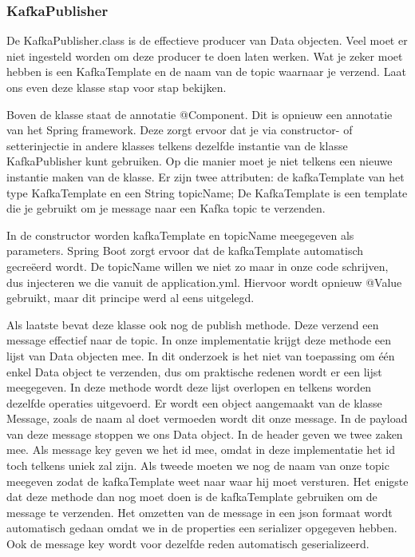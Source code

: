     \subsubsection{KafkaPublisher}
    De KafkaPublisher.class is de effectieve producer van Data objecten. Veel moet er niet ingesteld worden om deze producer te doen laten werken. Wat je zeker moet hebben is een KafkaTemplate en de naam van de topic waarnaar je verzend. Laat ons even deze klasse stap voor stap bekijken.
    
    Boven de klasse staat de annotatie @Component. Dit is opnieuw een annotatie van het Spring framework. Deze zorgt ervoor dat je via constructor- of setterinjectie in andere klasses telkens dezelfde instantie van de klasse KafkaPublisher kunt gebruiken. Op die manier moet je niet telkens een nieuwe instantie maken van de klasse. Er zijn twee attributen: de kafkaTemplate van het type KafkaTemplate en een String topicName; De KafkaTemplate is een template die je gebruikt om je message naar een Kafka topic te verzenden.
    
    In de constructor worden kafkaTemplate en topicName meegegeven als parameters. Spring Boot zorgt ervoor dat de kafkaTemplate automatisch gecreëerd wordt. De topicName willen we niet zo maar in onze code schrijven, dus injecteren we die vanuit de application.yml. Hiervoor wordt opnieuw @Value gebruikt, maar dit principe werd al eens uitgelegd.
    
    Als laatste bevat deze klasse ook nog de publish methode. Deze verzend een message effectief naar de topic. In onze implementatie krijgt deze methode een lijst van Data objecten mee. In dit onderzoek is het niet van toepassing om één enkel Data object te verzenden, dus om praktische redenen wordt er een lijst meegegeven. In deze methode wordt deze lijst overlopen en telkens worden dezelfde operaties uitgevoerd. Er wordt een object aangemaakt van de klasse Message, zoals de naam al doet vermoeden wordt dit onze message. In de payload van deze message stoppen we ons Data object. In de header geven we twee zaken mee. Als message key geven we het id mee, omdat in deze implementatie het id toch telkens uniek zal zijn. Als tweede moeten we nog de naam van onze topic meegeven zodat de kafkaTemplate weet naar waar hij moet versturen. Het enigste dat deze methode dan nog moet doen is de kafkaTemplate gebruiken om de message te verzenden. Het omzetten van de message in een json formaat wordt automatisch gedaan omdat we in de properties een serializer opgegeven hebben. Ook de message key wordt voor dezelfde reden automatisch geserializeerd. 
 
